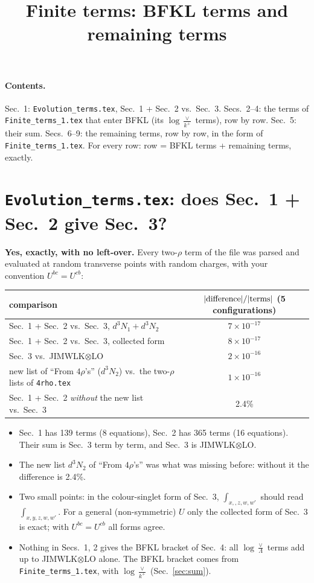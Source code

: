 \documentclass[9pt]{article}
\title{Finite terms: BFKL terms and remaining terms}
\author{}
\date{}
\numberwithin{equation}{section}
\begin{document}
\maketitle
\sloppy
\paragraph{Contents.} Sec.~1: \texttt{Evolution\_terms.tex}, Sec.~1 + Sec.~2 vs.\ Sec.~3. Secs.~2--4: the terms of \texttt{Finite\_terms\_1.tex} that enter BFKL (its $\log\frac{\vee}{k^+}$ terms), row by row. Sec.~5: their sum. Secs.~6--9: the remaining terms, row by row, in the form of \texttt{Finite\_terms\_1.tex}. For every row: row = BFKL terms + remaining terms, exactly.

\section{\texttt{Evolution\_terms.tex}: does Sec.~1 + Sec.~2 give Sec.~3?}
\textbf{Yes, exactly, with no left-over.} Every two-$\rho$ term of the file was parsed and evaluated at random transverse points with random charges, with your convention $U^{bc}=U^{cb}$:
\begin{center}\small
\begin{tabular}{@{}lc@{}}\hline
comparison & $|{\rm difference}|/|{\rm terms}|$ (5 configurations)\\\hline
Sec.~1 + Sec.~2 vs.\ Sec.~3, $d^3N_1+d^3N_2$ & $7\times10^{-17}$\\
Sec.~1 + Sec.~2 vs.\ Sec.~3, collected form & $8\times10^{-17}$\\
Sec.~3 vs.\ JIMWLK$\otimes$LO & $2\times10^{-16}$\\
new list of ``From $4\rho$'s'' ($d^3N_2$) vs.\ the two-$\rho$ lists of \texttt{4rho.tex} & $1\times10^{-16}$\\
Sec.~1 + Sec.~2 \emph{without} the new list vs.\ Sec.~3 & 2.4\%\\\hline
\end{tabular}
\end{center}
\begin{itemize}
\item Sec.~1 has 139 terms (8 equations), Sec.~2 has 365 terms (16 equations). Their sum is Sec.~3 term by term, and Sec.~3 is JIMWLK$\otimes$LO.
\item The new list $d^3N_2$ of ``From $4\rho$'s'' was what was missing before: without it the difference is 2.4\%.
\item Two small points: in the colour-singlet form of Sec.~3, $\int_{x,,z,w,w'}$ should read $\int_{x,y,z,w,w'}$. For a general (non-symmetric) $U$ only the collected form of Sec.~3 is exact; with $U^{bc}=U^{cb}$ all forms agree.
\item Nothing in Secs.~1, 2 gives the BFKL bracket of Sec.~4: all $\log\frac{\vee}{\Lambda}$ terms add up to JIMWLK$\otimes$LO alone. The BFKL bracket comes from \texttt{Finite\_terms\_1.tex}, with $\log\frac{\vee}{k^+}$ (Sec.~\ref{sec:sum}).
\end{itemize}
\end{document}
